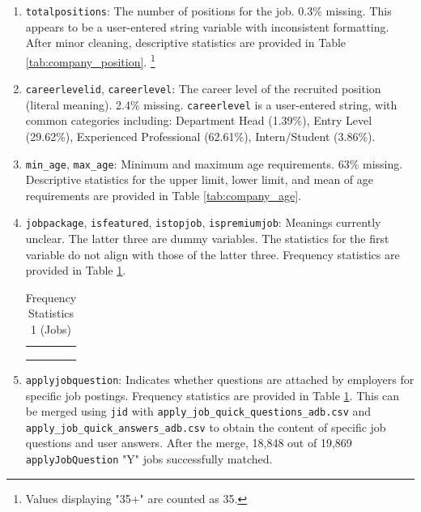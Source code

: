 \documentclass[12pt]{article}
\begin{document}
\begin{enumerate}
        
        \item \texttt{totalpositions}: The number of positions for the job. 0.3\% missing. This appears to be a user-entered string variable with inconsistent formatting. After minor cleaning, descriptive statistics are provided in Table \ref{tab:company_position}. \footnote{Values displaying "35+" are counted as 35.}
        

        
        \item \texttt{careerlevelid}, \texttt{careerlevel}: The career level of the recruited position (literal meaning). 2.4\% missing. \texttt{careerlevel} is a user-entered string, with common categories including: Department Head (1.39\%), Entry Level (29.62\%), Experienced Professional (62.61\%), Intern/Student (3.86\%).
        \item \texttt{min\_age}, \texttt{max\_age}: Minimum and maximum age requirements. 63\% missing. Descriptive statistics for the upper limit, lower limit, and mean of age requirements are provided in Table \ref{tab:company_age}.


        
        \item \texttt{jobpackage}, \texttt{isfeatured}, \texttt{istopjob}, \texttt{ispremiumjob}: Meanings currently unclear. The latter three are dummy variables. The statistics for the first variable do not align with those of the latter three. Frequency statistics are provided in Table \ref{tab:jobs_freq1}.
        
\begin{table}[]
    \centering
        \caption{Frequency Statistics 1 (Jobs)}
    \begin{tabular}{cccc}
\hline
\hline
\vspace{-0.4cm}
\\
 \\
\vspace{-1cm} \\
\hline 
\hline
    \end{tabular}
    \label{tab:jobs_freq1}
\end{table}




        
        \item \texttt{applyjobquestion}: Indicates whether questions are attached by employers for specific job postings. Frequency statistics are provided in Table \ref{tab:jobs_freq1}. This can be merged using \texttt{jid} with \texttt{apply\_job\_quick\_questions\_adb.csv} and \texttt{apply\_job\_quick\_answers\_adb.csv} to obtain the content of specific job questions and user answers. After the merge, 18,848 out of 19,869 \texttt{applyJobQuestion} "Y" jobs successfully matched.



\end{enumerate}
\end{document}
